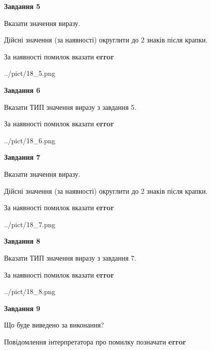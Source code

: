 \documentclass[11pt, ukrainian]{article}
\begin{document}
{\begin {large}
{\begin {center}\textbf{Завдання 5}\end {center}}\par
Вказати значення виразу. \par
Дійсні значення (за наявності) округлити до 2 знаків після крапки. \par
За наявності помилок вказати \textbf{error}

\begin{center}
	{../pict/18_5.png}
\end{center}
\newpage

{\begin {center}\textbf{Завдання 6}\end {center}}\par
Вказати ТИП значення виразу з завдання 5. \par
За наявності помилок вказати \textbf{error}

\begin{center}
	{../pict/18_6.png}
\end{center}
\newpage

{\begin {center}\textbf{Завдання 7}\end {center}}\par
Вказати значення виразу. \par
Дійсні значення (за наявності) округлити до 2 знаків після крапки. \par
За наявності помилок вказати \textbf{error}

\begin{center}
	{../pict/18_7.png}
\end{center}
\newpage

{\begin {center}\textbf{Завдання 8}\end {center}}\par
Вказати ТИП значення виразу з завдання 7. \par
За наявності помилок вказати \textbf{error}

\begin{center}
	{../pict/18_8.png}
\end{center}
\newpage

{\begin {center}\textbf{Завдання 9}\end {center}}\par
Що буде виведено за виконання? \par
Повідомлення інтерпретатора про помилку позначати \textbf{error}


\end{large}}
\end{document}
